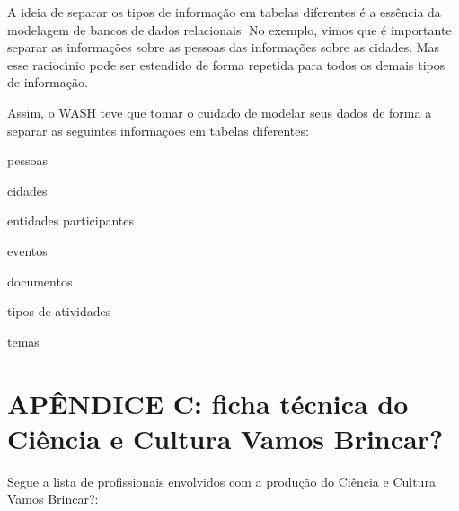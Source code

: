 \documentclass[
12pt,		%
openright,	%
twoside,  %
a4paper,			%
chapter=TITLE,		%
english,			%
french,				%
spanish,			%
brazil				%
]{USPSC-classe/USPSC}
\begin{document}
A ideia de separar os tipos de informa\c{c}\~ao em tabelas diferentes \'e a ess\^encia da modelagem de bancos de dados relacionais. No exemplo, vimos que \'e importante separar as informa\c{c}\~oes sobre as pessoas das informa\c{c}\~oes sobre as cidades. Mas esse racioc\'{\i}nio pode ser estendido de forma repetida para todos os demais tipos de informa\c{c}\~ao.








Assim, o WASH teve que tomar o cuidado de modelar seus dados de forma a separar as seguintes informa\c{c}\~oes em tabelas diferentes:









\begin{alineas}
\item pessoas
\item cidades
\item entidades participantes
\item eventos
\item documentos
\item tipos de atividades
\item temas
\end{alineas}

\chapter[AP\^ENDICE C: ficha t\'ecnica do \textquotedbl Ci\^encia e Cultura Vamos Brincar?\textquotedbl ]{AP\^ENDICE C: ficha t\'ecnica do \textquotedbl Ci\^encia e Cultura Vamos Brincar?\textquotedbl }\label{AP\^ENDICE C: ficha t\'ecnica do \textquotedbl Ci\^encia e Cultura Vamos Brincar?\textquotedbl }
Segue a lista de profissionais envolvidos com a produ\c{c}\~ao do \textquotedbl Ci\^encia e Cultura Vamos Brincar?\textquotedbl :
\end{document}
